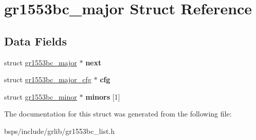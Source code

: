 \hypertarget{structgr1553bc__major}{}\section{gr1553bc\+\_\+major Struct Reference}
\label{structgr1553bc__major}
\subsection*{Data Fields}
\begin{DoxyCompactItemize}
\item 
\mbox{\label{structgr1553bc__major_aa3104dc95b10465d9fe628a8bf491152}} 
struct \mbox{\hyperlink{structgr1553bc__major}{gr1553bc\+\_\+major}} $\ast$ {\bfseries next}
\item 
\mbox{\label{structgr1553bc__major_a6a7c15cdbc5a2dca556a89e5902170d9}} 
struct \mbox{\hyperlink{structgr1553bc__major__cfg}{gr1553bc\+\_\+major\+\_\+cfg}} $\ast$ {\bfseries cfg}
\item 
\mbox{\label{structgr1553bc__major_a1fc847107a1f144ce42077e6725d7ad7}} 
struct \mbox{\hyperlink{structgr1553bc__minor}{gr1553bc\+\_\+minor}} $\ast$ {\bfseries minors} \mbox{[}1\mbox{]}
\end{DoxyCompactItemize}


The documentation for this struct was generated from the following file\+:\begin{DoxyCompactItemize}
\item 
bsps/include/grlib/gr1553bc\+\_\+list.\+h\end{DoxyCompactItemize}
